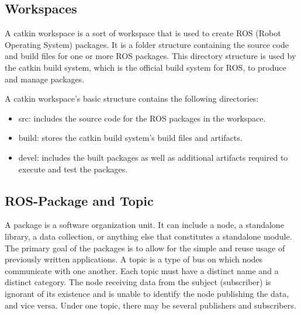 \documentclass[11pt, a4paper, openany]{book}
\begin{document}
\subsection{Workspaces}
A catkin workspace is a sort of workspace that is used to create ROS (Robot Operating System) packages. It is a folder structure containing the source code and build files for one or more ROS packages. This directory structure is used by the catkin build system, which is the official build system for ROS, to produce and manage packages.

A catkin workspace's basic structure contains the following directories:
 \begin{itemize}
\item src: includes the source code for the ROS packages in the workspace.
\item build: stores the catkin build system's build files and artifacts.
\item devel: includes the built packages as well as additional artifacts required to execute and test the packages.
 \end{itemize}
\subsection{ROS-Package and Topic}
A package is a software organization unit. It can include a node, a standalone library, a data collection, or anything else that constitutes a standalone module. The primary goal of the packages is to allow for the simple and reuse usage of previously written applications.\newline
A topic is a type of bus on which nodes communicate with one another. Each topic must have a distinct name and a distinct category. The node receiving data from the subject (subscriber) is ignorant of its existence and is unable to identify the node publishing the data, and vice versa. Under one topic, there may be several publishers and subscribers. \newline


\end{document}
